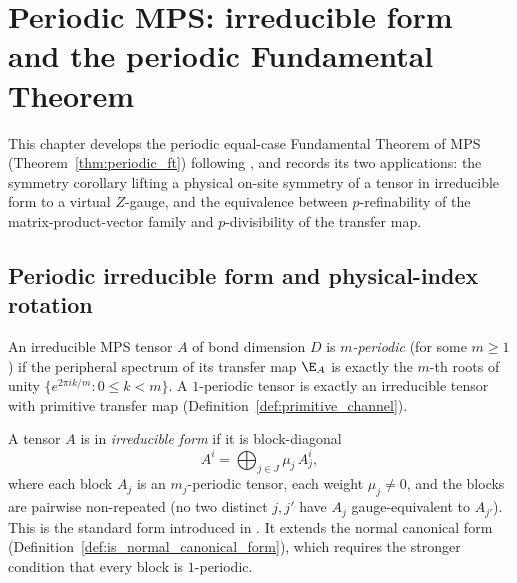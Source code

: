 
\chapter{Periodic MPS: irreducible form and the periodic Fundamental Theorem}%
\label{ch:periodic_ft_apps}

This chapter develops the periodic equal-case Fundamental Theorem of MPS
(Theorem~\ref{thm:periodic_ft}) following
\cite{DeLasCuevas2017Irreducible}, and records its two applications:
the symmetry corollary lifting a physical on-site symmetry of a tensor
in irreducible form to a virtual $Z$-gauge, and the equivalence between
$p$-refinability of the matrix-product-vector family and
$p$-divisibility of the transfer map.

\section{Periodic irreducible form and physical-index rotation}%
\label{sec:periodic_irreducible_rotation}

\begin{definition}
    \label{def:periodic_tensor}
    \leanok
    An irreducible MPS tensor $A$ of bond dimension $D$ is
    \emph{$m$-periodic} (for some $m \ge 1$) if the peripheral spectrum
    of its transfer map $\E_A$ is exactly the $m$-th roots of unity
    $\{e^{2\pi i k/m} : 0 \le k < m\}$.
    A $1$-periodic tensor is exactly an irreducible tensor with
    primitive transfer map (Definition~\ref{def:primitive_channel}).
\end{definition}

\begin{definition}
    \label{def:irreducible_form}
    \leanok
    A tensor $A$ is in \emph{irreducible form} if it is block-diagonal
    \[
        A^i = \bigoplus_{j \in J} \mu_j\, A_j^i,
    \]
    where each block $A_j$ is an $m_j$-periodic tensor,
    each weight $\mu_j \neq 0$, and the blocks are pairwise
    non-repeated (no two distinct $j, j'$ have $A_j$ gauge-equivalent
    to $A_{j'}$).
    This is the standard form introduced in \cite[\S II]{DeLasCuevas2017Irreducible}.
    It extends the normal canonical form
    (Definition~\ref{def:is_normal_canonical_form}),
    which requires the stronger condition that every block is $1$-periodic.
\end{definition}

